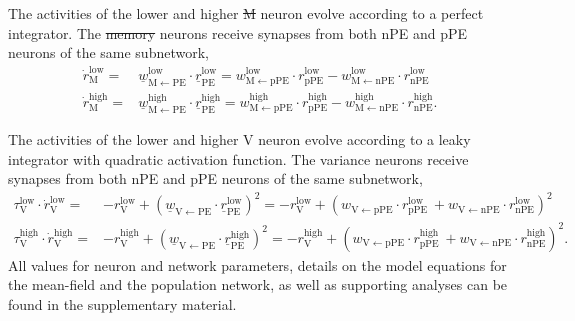 \documentclass[10pt,a4paper]{article}
\providecommand{\DIFaddtex}[1]{{\protect\color{blue}\uwave{#1}}} %
\providecommand{\DIFdeltex}[1]{{\protect\color{red}\sout{#1}}}                      %
\providecommand{\DIFaddbegin}{} %
\providecommand{\DIFaddend}{} %
\providecommand{\DIFdelbegin}{} %
\providecommand{\DIFdelend}{} %
\providecommand{\DIFadd}[1]{\texorpdfstring{\DIFaddtex{#1}}{#1}} %
\providecommand{\DIFdel}[1]{\texorpdfstring{\DIFdeltex{#1}}{}} %
\newcommand{\DIFscaledelfig}{0.5}
\newlength{\DIFdelgraphicswidth} %
\newlength{\DIFdelgraphicsheight} %
\newcommand{\DIFaddincludegraphics}[2][]{{\color{blue}\fbox{\DIFOincludegraphics[#1]{#2}}}} %
\newcommand{\DIFdelincludegraphics}[2][]{%
\sbox{\DIFdelgraphicsbox}{\DIFOincludegraphics[#1]{#2}}%
\settoboxwidth{\DIFdelgraphicswidth}{\DIFdelgraphicsbox} %
\settoboxtotalheight{\DIFdelgraphicsheight}{\DIFdelgraphicsbox} %
\scalebox{\DIFscaledelfig}{%
\parbox[b]{\DIFdelgraphicswidth}{\usebox{\DIFdelgraphicsbox}\\[-\baselineskip] \rule{\DIFdelgraphicswidth}{0em}}\llap{\resizebox{\DIFdelgraphicswidth}{\DIFdelgraphicsheight}{%
\setlength{\unitlength}{\DIFdelgraphicswidth}%
\begin{picture}(1,1)%
\thicklines\linethickness{2pt} %
{\color[rgb]{1,0,0}\put(0,0){\framebox(1,1){}}}%
{\color[rgb]{1,0,0}\put(0,0){\line( 1,1){1}}}%
{\color[rgb]{1,0,0}\put(0,1){\line(1,-1){1}}}%
\end{picture}%
}\hspace*{3pt}}} %
} %
\DeclareRobustCommand{\DIFaddbegin}{\DIFOaddbegin \let\includegraphics\DIFaddincludegraphics} %
\DeclareRobustCommand{\DIFaddend}{\DIFOaddend \let\includegraphics\DIFOincludegraphics} %
\DeclareRobustCommand{\DIFdelbegin}{\DIFOdelbegin \let\includegraphics\DIFdelincludegraphics} %
\DeclareRobustCommand{\DIFdelend}{\DIFOaddend \let\includegraphics\DIFOincludegraphics} %
\begin{document}
The activities of the lower and higher \DIFdelbegin \DIFdel{M }\DIFdelend \DIFaddbegin \DIFadd{memory (M) }\DIFaddend neuron evolve according to a perfect integrator. The \DIFdelbegin \DIFdel{memory }\DIFdelend \DIFaddbegin \DIFadd{M }\DIFaddend neurons receive synapses from both nPE and pPE neurons of the same subnetwork,
%
\begin{align}
\dot{r}_\mathrm{M}^\mathrm{low} =& \underline{w}_\mathrm{M \leftarrow PE}^\mathrm{low} \cdot \underline{r}_\mathrm{PE}^\mathrm{low} = w_\mathrm{M \leftarrow pPE}^\mathrm{low} \cdot r_\mathrm{pPE}^\mathrm{low} - w_\mathrm{M \leftarrow nPE}^\mathrm{low} \cdot r_\mathrm{nPE}^\mathrm{low} \nonumber \\
%
\dot{r}_\mathrm{M}^\mathrm{high} =& \underline{w}_\mathrm{M \leftarrow PE} ^\mathrm{high} \cdot \underline{r}_\mathrm{PE}^\mathrm{high} = w_\mathrm{M \leftarrow pPE}^\mathrm{high}  \cdot r_\mathrm{pPE}^\mathrm{high} - w_\mathrm{M \leftarrow nPE}^\mathrm{high}  \cdot r_\mathrm{nPE}^\mathrm{high} .
\end{align}
%

The activities of the lower and higher V neuron evolve according to a leaky integrator with quadratic activation function. The variance neurons receive synapses from both nPE and pPE neurons of the same subnetwork,
%
\begin{align}
\tau_\mathrm{V}^\mathrm{low} \cdot \dot{r}_\mathrm{V}^\mathrm{low} =& - r_\mathrm{V}^\mathrm{low} + \left( \underline{w}_\mathrm{V \leftarrow PE} \cdot \underline{r}_\mathrm{PE}^\mathrm{low}\right)^2 = - r_\mathrm{V}^\mathrm{low} + \left( w_\mathrm{V \leftarrow pPE} \cdot r_\mathrm{pPE}^\mathrm{low}\ + w_\mathrm{V \leftarrow nPE} \cdot r_\mathrm{nPE}^\mathrm{low}\right)^2 \nonumber\\
%
\tau_\mathrm{V}^\mathrm{high} \cdot \dot{r}_\mathrm{V}^\mathrm{high} =& - r_\mathrm{V}^\mathrm{high} + \left( \underline{w}_\mathrm{V \leftarrow PE} \cdot \underline{r}_\mathrm{PE}^\mathrm{high}\right)^2 = - r_\mathrm{V}^\mathrm{high} + \left( w_\mathrm{V \leftarrow pPE} \cdot r_\mathrm{pPE}^\mathrm{high}\ + w_\mathrm{V \leftarrow nPE} \cdot r_\mathrm{nPE}^\mathrm{high}\right)^2.
\end{align} 
%
All values for neuron and network parameters, details on the model equations for the mean-field and the population network, as well as supporting analyses can be found in the supplementary material.
\end{document}
